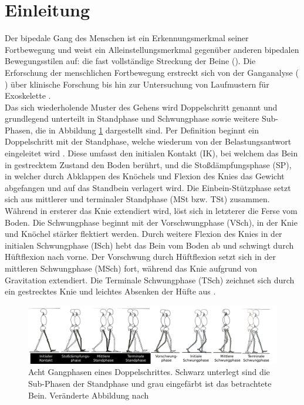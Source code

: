 \section{Einleitung}
Der bipedale Gang des Menschen ist ein Erkennungsmerkmal seiner Fortbewegung und weist ein Alleinstellungsmerkmal gegenüber anderen bipedalen Bewegungsstilen auf: die fast vollständige Streckung der Beine (\cite{alexander1992simple}). Die Erforschung der menschlichen Fortbewegung erstreckt sich von der Ganganalyse (\cite{alexander1992simple} \cite{perry2010gait}) über klinische Forschung \autocite{wren2011efficacy} bis hin zur Untersuchung von Laufmustern für Exoskelette \autocite{barbareschi2015statically}.\\
Das sich wiederholende Muster des Gehens wird Doppelschritt genannt und grundlegend unterteilt in Standphase und Schwungphase sowie weitere Sub-Phasen, die in Abbildung \ref{fig:Skizze_Phasen} dargestellt sind. Per Definition beginnt ein Doppelschritt mit der Standphase, welche wiederum von der Belastungsantwort eingeleitet wird \parencite{perry2010gait}. Diese umfasst den initialen Kontakt (IK), bei welchem das Bein in gestrecktem Zustand den Boden berührt, und die Stoßdämpfungsphase (SP), in welcher durch Abklappen des Knöchels und Flexion des Knies das Gewicht abgefangen und auf das Standbein verlagert wird. Die Einbein-Stützphase setzt sich aus mittlerer und terminaler Standphase (MSt bzw. TSt) zusammen. Während in ersterer das Knie extendiert wird, löst sich in letzterer die Ferse vom Boden. Die Schwungphase beginnt mit der Vorschwungphase (VSch), in der Knie und Knöchel stärker flektiert werden. Durch weitere Flexion des Knies in der initialen Schwungphase (ISch) hebt das Bein vom Boden ab und schwingt durch Hüftflexion nach vorne. Der Vorschwung durch Hüftflexion setzt sich in der mittleren Schwungphase (MSch) fort, während das Knie aufgrund von Gravitation extendiert. Die Terminale Schwungphase (TSch) zeichnet sich durch ein gestrecktes Knie und leichtes Absenken der Hüfte aus \autocite{perry2010gait}.
\begin{figure}[h!]
	\centering
	\includegraphics[width=\linewidth]{bilder/Einleitung/Skizze_Gangphasen_small}
	\caption[Gangphasen]{Acht Gangphasen eines Doppelschrittes. Schwarz unterlegt sind die Sub-Phasen der Standphase und grau eingefärbt ist das betrachtete Bein. Veränderte Abbildung nach \autocite{perry2010gait}}
	\label{fig:Skizze_Phasen}
\end{figure}\\
